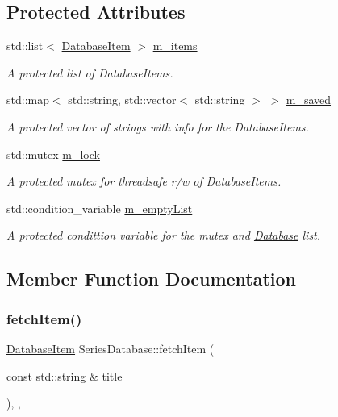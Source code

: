 \subsection*{Protected Attributes}
\begin{DoxyCompactItemize}
\item 
std\+::list$<$ \hyperlink{classDatabaseItem}{Database\+Item} $>$ \hyperlink{classDatabase_a5a4ac1f3bf0f5fd77a696174ad9e5c45}{m\+\_\+items}
\begin{DoxyCompactList}\small\item\em A protected list of Database\+Items. \end{DoxyCompactList}\item 
std\+::map$<$ std\+::string, std\+::vector$<$ std\+::string $>$ $>$ \hyperlink{classDatabase_a9f87cbe5a1be71d541083dffa8d8c9ad}{m\+\_\+saved}
\begin{DoxyCompactList}\small\item\em A protected vector of strings with info for the Database\+Items. \end{DoxyCompactList}\item 
std\+::mutex \hyperlink{classDatabase_a7f55f3a5d93c9694ee4f08a2f2135b1d}{m\+\_\+lock}
\begin{DoxyCompactList}\small\item\em A protected mutex for threadsafe r/w of Database\+Items. \end{DoxyCompactList}\item 
std\+::condition\+\_\+variable \hyperlink{classDatabase_a2ad8bf38964b3e18a0e168437acbdb27}{m\+\_\+empty\+List}
\begin{DoxyCompactList}\small\item\em A protected condittion variable for the mutex and \hyperlink{classDatabase}{Database} list. \end{DoxyCompactList}\end{DoxyCompactItemize}


\subsection{Member Function Documentation}
\mbox{\label{classSeriesDatabase_af5303a723910395b31f2e01088de9130}} 
\subsubsection{\texorpdfstring{fetch\+Item()}{fetchItem()}}
{\footnotesize\ttfamily \hyperlink{classDatabaseItem}{Database\+Item} Series\+Database\+::fetch\+Item (\begin{DoxyParamCaption}\item[{const std\+::string \&}]{title }\end{DoxyParamCaption})\hspace{0.3cm}{\ttfamily [inline]}, {\ttfamily [override]}, {\ttfamily [virtual]}}



